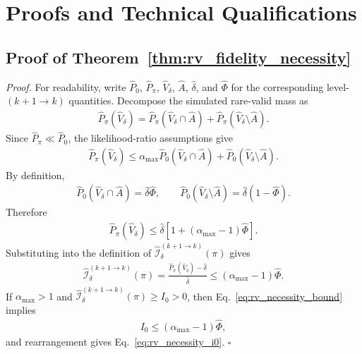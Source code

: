 \documentclass[
  aps,
  prresearch,
  reprint,
  amsmath,
  amssymb,
  superscriptaddress,
  nofootinbib,
  longbibliography
]{revtex4-2}
\def\EQSP{3pt}
\newcommand{\cgather}[2][\EQSP]{\begingroup\setlength\abovedisplayskip{#1}\setlength\belowdisplayskip{#1}\begin{gather} #2 \end{gather}\endgroup\noindent}
\newcommand{\calI}{\mathcal{I}}
\begin{document}
\clearpage


\appendix


\section{Proofs and Technical Qualifications}
\label{app:proofs}


\subsection{Proof of Theorem~\ref{thm:rv_fidelity_necessity}}

\noindent\emph{Proof.}
For readability, write \(\widehat P_0\), \(\widehat P_\pi\), \(\widehat V_\delta\), \(\widehat A\), \(\widehat\delta\), and \(\widehat\Phi\) for the corresponding level-\((k+1\to k)\) quantities. Decompose the simulated rare-valid mass as
\cgather{
    \widehat P_\pi(\widehat V_\delta)
    =
    \widehat P_\pi(\widehat V_\delta\cap\widehat A)
    +
    \widehat P_\pi(\widehat V_\delta\setminus\widehat A).
}
Since \(\widehat P_\pi\ll\widehat P_0\), the likelihood-ratio assumptions give
\cgather{
    \widehat P_\pi(\widehat V_\delta)
    \leq
    \alpha_{\max}\widehat P_0(\widehat V_\delta\cap\widehat A)
    +
    \widehat P_0(\widehat V_\delta\setminus\widehat A).
}
By definition,
\cgather{
    \widehat P_0(\widehat V_\delta\cap\widehat A)
    =
    \widehat\delta\widehat\Phi,
    \qquad
    \widehat P_0(\widehat V_\delta\setminus\widehat A)
    =
    \widehat\delta(1-\widehat\Phi).
}
Therefore
\cgather{
    \widehat P_\pi(\widehat V_\delta)
    \leq
    \widehat\delta
    \left[1+(\alpha_{\max}-1)\widehat\Phi\right].
}
Substituting into the definition of \(\widehat{\calI}_\delta^{(k+1\to k)}(\pi)\) gives
\cgather{
    \widehat{\calI}_\delta^{(k+1\to k)}(\pi)
    =
    \frac{\widehat P_\pi(\widehat V_\delta)-\widehat\delta}{\widehat\delta}
    \leq
    (\alpha_{\max}-1)\widehat\Phi.
}
If \(\alpha_{\max}>1\) and \(\widehat{\calI}_\delta^{(k+1\to k)}(\pi)\geq I_0>0\), then Eq.~\eqref{eq:rv_necessity_bound} implies
\cgather{
    I_0
    \leq
    (\alpha_{\max}-1)\widehat\Phi,
}
and rearrangement gives Eq.~\eqref{eq:rv_necessity_i0}. \(\square\)
\end{document}
